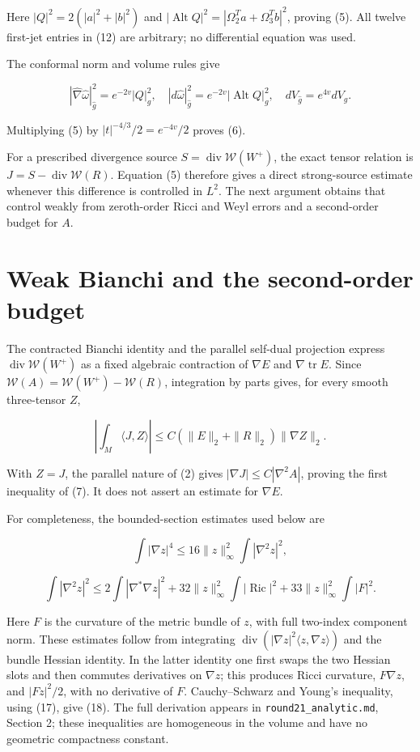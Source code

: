 \documentclass[
]{article}
\begin{document}
Here \(|Q|^2=2(|a|^2+|b|^2)\) and
\(|\operatorname{Alt}Q|^2=|\Omega_2^Ta+\Omega_3^Tb|^2\), proving (5).
All twelve first-jet entries in (12) are arbitrary; no differential
equation was used.

The conformal norm and volume rules give

\[
 |\widehat\nabla\widehat\omega|_{\widehat g}^2=e^{-2v}|Q|_g^2,
 \quad |d\widehat\omega|_{\widehat g}^2=e^{-2v}|\operatorname{Alt}Q|_g^2,
 \quad dV_{\widehat g}=e^{4v}dV_g.
\]

Multiplying (5) by \(|t|^{-4/3}/2=e^{-4v}/2\) proves (6).

For a prescribed divergence source
\(S=\operatorname{div}\mathcal W(W^+)\), the exact tensor relation is
\(J=S-\operatorname{div}\mathcal W(R)\). Equation (5) therefore gives a
direct strong-source estimate whenever this difference is controlled in
\(L^2\). The next argument obtains that control weakly from zeroth-order
Ricci and Weyl errors and a second-order budget for \(A\).

\hypertarget{weak-bianchi-and-the-second-order-budget}{%
\section{Weak Bianchi and the second-order
budget}\label{weak-bianchi-and-the-second-order-budget}}

The contracted Bianchi identity and the parallel self-dual projection
express \(\operatorname{div}\mathcal W(W^+)\) as a fixed algebraic
contraction of \(\nabla E\) and \(\nabla\operatorname{tr}E\). Since
\(\mathcal W(A)=\mathcal W(W^+)-\mathcal W(R)\), integration by parts
gives, for every smooth three-tensor \(Z\),

\[
 \left|\int_M\langle J,Z\rangle\right|
       \le C(\|E\|_2+\|R\|_2)\|\nabla Z\|_2.
 \tag{16}
\]

With \(Z=J\), the parallel nature of (2) gives
\(|\nabla J|\le C|\nabla^2 A|\), proving the first inequality of (7). It
does not assert an estimate for \(\nabla E\).

For completeness, the bounded-section estimates used below are

\[
 \int|\nabla z|^4\le16\|z\|_\infty^2\int|\nabla^2z|^2,
 \tag{17}
\]

\[
 \int|\nabla^2z|^2
 \le2\int|\nabla^*\nabla z|^2
       +32\|z\|_\infty^2\int|\operatorname{Ric}|^2
       +33\|z\|_\infty^2\int|F|^2.
 \tag{18}
\]

Here \(F\) is the curvature of the metric bundle of \(z\), with full
two-index component norm. These estimates follow from integrating
\(\operatorname{div}(|\nabla z|^2\langle z,\nabla z\rangle)\) and the
bundle Hessian identity. In the latter identity one first swaps the two
Hessian slots and then commutes derivatives on \(\nabla z\); this
produces Ricci curvature, \(F\nabla z\), and \(|Fz|^2/2\), with no
derivative of \(F\). Cauchy--Schwarz and Young's inequality, using (17),
give (18). The full derivation appears in \texttt{round21\_analytic.md},
Section 2; these inequalities are homogeneous in the volume and have no
geometric compactness constant.
\end{document}
